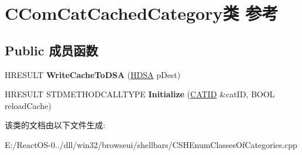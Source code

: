 \hypertarget{class_c_com_cat_cached_category}{}\section{C\+Com\+Cat\+Cached\+Category类 参考}
\label{class_c_com_cat_cached_category}
\subsection*{Public 成员函数}
\begin{DoxyCompactItemize}
\item 
\mbox{\label{class_c_com_cat_cached_category_a9544cfcc1c104bc1aeb718178c56d00d}} 
H\+R\+E\+S\+U\+LT {\bfseries Write\+Cache\+To\+D\+SA} (\hyperlink{struct___d_s_a}{H\+D\+SA} p\+Dest)
\item 
\mbox{\label{class_c_com_cat_cached_category_adc34138d0c70810362cbf208acc0dfc1}} 
H\+R\+E\+S\+U\+LT S\+T\+D\+M\+E\+T\+H\+O\+D\+C\+A\+L\+L\+T\+Y\+PE {\bfseries Initialize} (\hyperlink{interface_g_u_i_d}{C\+A\+T\+ID} \&cat\+ID, B\+O\+OL reload\+Cache)
\end{DoxyCompactItemize}


该类的文档由以下文件生成\+:\begin{DoxyCompactItemize}
\item 
E\+:/\+React\+O\+S-\/0../dll/win32/browseui/shellbars/C\+S\+H\+Enum\+Classes\+Of\+Categories.\+cpp\end{DoxyCompactItemize}
